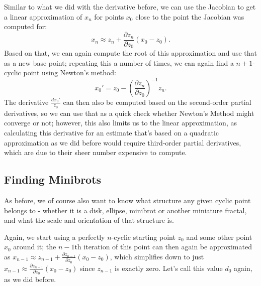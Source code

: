 \documentclass[12pt,a4paper]{article}
\newcommand{\jmat}[2]{\frac{\partial #1}{\partial #2}}
\begin{document}
Similar to what we did with the derivative before, we can use the Jacobian to get a linear approximation of $x_n$ for points $x_0$ close to the point the Jacobian was computed for:
$$x_n \approx z_n+\jmat{z_n}{z_0}(x_0-z_0).$$
Based on that, we can again compute the root of this approximation and use that as a new base point; repeating this a number of times, we can again find a $n+1$-cyclic point using Newton's method:
$$x_0' = z_0-\left(\jmat{z_n}{z_0}\right)^{-1}z_n.$$
The derivative $\frac{dx_0'}{z_0}$ can then also be computed based on the second-order partial derivatives, so we can use that as a quick check whether Newton's Method might converge or not; however, this also limits us to the linear approximation, as calculating this derivative for an estimate that's based on a quadratic approximation as we did before would require third-order partial derivatives, which are due to their sheer number expensive to compute.

\subsection{Finding Minibrots}

As before, we of course also want to know what structure any given cyclic point belongs to - whether it is a disk, ellipse, minibrot or another miniature fractal, and what the scale and orientation of that structure is.

Again, we start using a perfectly $n$-cyclic starting point $z_0$ and some other point $x_0$ around it; the $n-1$th iteration of this point can then again be approximated as $x_{n-1} \approx z_{n-1}+\jmat{z_{n-1}}{z_0}(x_0-z_0)$, which simplifies down to just $x_{n-1} \approx \jmat{z_{n-1}}{z_0}(x_0-z_0)$ since $z_{n-1}$ is exactly zero. Let's call this value $d_0$ again, as we did before.
\end{document}
